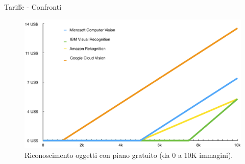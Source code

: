 %
\begin{frame}[t]{Tariffe - Confronti}
	\begin{figure}[h]
	\centering
	    \includegraphics[width=.6\paperwidth,keepaspectratio=true]{../../doc/img/grafico1}
		{\tiny \caption{Riconoscimento oggetti con piano gratuito (da 0 a 10K immagini).}}
		\label{fig:tariffe-riconoscimento-oggetti-con-gratuito}
	\end{figure}
\end{frame}
%
